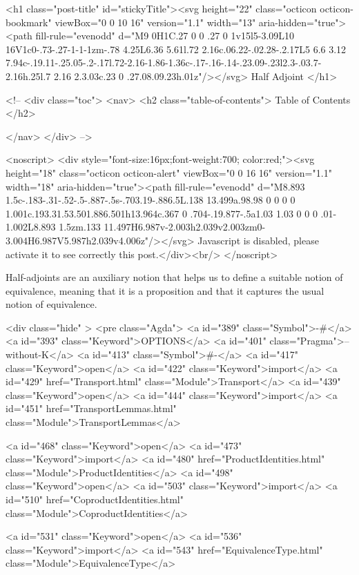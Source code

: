   <h1 class="post-title" id="stickyTitle"><svg height="22" class="octicon octicon-bookmark" viewBox="0 0 10 16" version="1.1" width="13" aria-hidden="true"><path fill-rule="evenodd" d="M9 0H1C.27 0 0 .27 0 1v15l5-3.09L10 16V1c0-.73-.27-1-1-1zm-.78 4.25L6.36 5.61l.72 2.16c.06.22-.02.28-.2.17L5 6.6 3.12 7.94c-.19.11-.25.05-.2-.17l.72-2.16-1.86-1.36c-.17-.16-.14-.23.09-.23l2.3-.03.7-2.16h.25l.7 2.16 2.3.03c.23 0 .27.08.09.23h.01z"/></svg> Half Adjoint
  </h1>

  <!-- 
  <div class="toc">
    <nav>
    <h2 class="table-of-contents"> Table of Contents </h2>
      

    </nav>
  </div>
   -->

  <noscript>
  <div style="font-size:16px;font-weight:700; color:red;"><svg height="18" class="octicon octicon-alert" viewBox="0 0 16 16" version="1.1" width="18" aria-hidden="true"><path fill-rule="evenodd" d="M8.893 1.5c-.183-.31-.52-.5-.887-.5s-.703.19-.886.5L.138 13.499a.98.98 0 0 0 0 1.001c.193.31.53.501.886.501h13.964c.367 0 .704-.19.877-.5a1.03 1.03 0 0 0 .01-1.002L8.893 1.5zm.133 11.497H6.987v-2.003h2.039v2.003zm0-3.004H6.987V5.987h2.039v4.006z"/></svg> Javascript is disabled, please activate it to see correctly this post.</div><br/>
  </noscript>

  Half-adjoints are an auxiliary notion that helps us to define a suitable notion
of equivalence, meaning that it is a proposition and that it captures the usual
notion of equivalence.

<div class="hide" >
<pre class="Agda">
<a id="389" class="Symbol">{-#</a> <a id="393" class="Keyword">OPTIONS</a> <a id="401" class="Pragma">--without-K</a> <a id="413" class="Symbol">#-}</a>
<a id="417" class="Keyword">open</a> <a id="422" class="Keyword">import</a> <a id="429" href="Transport.html" class="Module">Transport</a>
<a id="439" class="Keyword">open</a> <a id="444" class="Keyword">import</a> <a id="451" href="TransportLemmas.html" class="Module">TransportLemmas</a>

<a id="468" class="Keyword">open</a> <a id="473" class="Keyword">import</a> <a id="480" href="ProductIdentities.html" class="Module">ProductIdentities</a>
<a id="498" class="Keyword">open</a> <a id="503" class="Keyword">import</a> <a id="510" href="CoproductIdentities.html" class="Module">CoproductIdentities</a>

<a id="531" class="Keyword">open</a> <a id="536" class="Keyword">import</a> <a id="543" href="EquivalenceType.html" class="Module">EquivalenceType</a>

